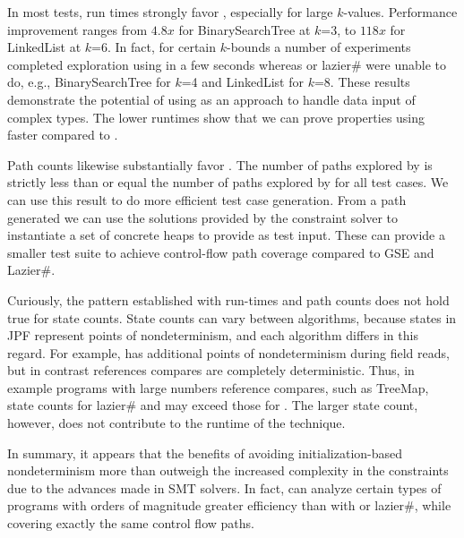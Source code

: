 In most tests, run times strongly favor \symtxt{}, especially for
large $k$-values. Performance improvement ranges from $4.8x$ for
BinarySearchTree at $k$=3, to $118x$ for LinkedList at $k$=6. In fact,
for certain $k$-bounds a number of experiments completed exploration
using \symtxt{} in a few seconds whereas \gsetxt{} or lazier\# were
unable to do, e.g., BinarySearchTree for $k$=4 and LinkedList for
$k$=8. These results demonstrate the potential of using \symtxt{} as
an approach to handle data input of complex types. The lower runtimes
show that we can prove properties using \symtxt{} faster compared to
\gsetxt{}.


Path counts likewise substantially favor \symtxt{}. The number of
paths explored by \symtxt{} is strictly less than or equal the number
of paths explored by \gsetxt{} for all test cases. We can use this
result to do more efficient test case generation. From a path
generated we can use the solutions provided by the constraint solver
to instantiate a set of concrete heaps to provide as test input. These
can provide a smaller test suite to achieve control-flow path coverage
compared to GSE and Lazier\#.



Curiously, the pattern established with run-times and path counts does
not hold true for state counts. State counts can vary between
algorithms, because states in JPF represent points of nondeterminism,
and each algorithm differs in this regard. For example, \gsetxt{} has
additional points of nondeterminism during field reads, but in
contrast references compares are completely deterministic. Thus, in
example programs with large numbers reference compares, such as
TreeMap, state counts for lazier\# and \symtxt{} may exceed those for
\gsetxt{}. The larger state count, however, does not contribute to the
runtime of the technique.


In summary, it appears that the benefits of avoiding
initialization-based nondeterminism more than outweigh the increased
complexity in the constraints due to the advances made in SMT
solvers. In fact, \symtxt{} can analyze certain types of programs with
orders of magnitude greater efficiency than with \gsetxt{} or
lazier\#, while covering exactly the same control flow paths. 
